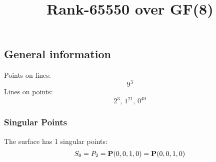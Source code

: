 \documentclass{article}
\newcommand\setTBstruts{\def\T{\rule{0pt}{2.6ex}}%
\def\B{\rule[-1.2ex]{0pt}{0pt}}}
\newcommand{\bP}{{\bf P}}
\begin{document}
 
\setTBstruts



{\allowdisplaybreaks%






\title{Rank-65550 over GF(8)}
\author{}%
\maketitle%
%
{}



\subsection*{General information}
Points on lines:
$$
9^3$$
Lines on points:
$$
2^3,\,1^{21},\,0^{49}$$
\subsubsection*{Singular Points}
The surface has 1 singular points:\\
\begin{align*}
S_{0} &= P_{2}=\bP(0, 0, 1, 0) = \bP(0, 0, 1, 0)\\
\end{align*}
}
\end{document}
